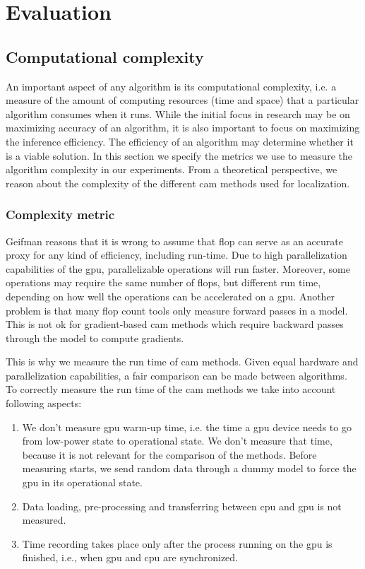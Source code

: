 \section{Evaluation}
\subsection{Computational complexity}
An important aspect of any algorithm is its computational complexity, i.e. a measure of the amount of computing resources (time and space) that a particular algorithm consumes when it runs. While the initial focus in research may be on maximizing accuracy of an algorithm, it is also important to focus on maximizing the inference efficiency. The efficiency of an algorithm may determine whether it is a viable solution. In this section we specify the metrics we use to measure the algorithm complexity in our experiments. From a theoretical perspective, we reason about the complexity of the different \acrshort{cam} methods used for localization.

\subsubsection{Complexity metric}
Geifman \cite{article:FLOPSvsRuntime} reasons that it is wrong to assume that \acrfull{flop} can serve as an accurate proxy for any kind of efficiency, including run-time. Due to high parallelization capabilities of the \acrshort{gpu}, parallelizable operations will run faster. Moreover, some operations may require the same number of \acrshort{flop}s, but different run time, depending on how well the operations can be accelerated on a \acrshort{gpu}. Another problem is that many \acrshort{flop} count tools only measure forward passes in a model. This is not ok for gradient-based \acrshort{cam} methods which require backward passes through the model to compute gradients.

This is why we measure the run time of \acrshort{cam} methods. Given equal hardware and parallelization capabilities, a fair comparison can be made between algorithms. To correctly measure the run time of the \acrshort{cam} methods we take into account following aspects:
\begin{enumerate}
    \item We don't measure \acrshort{gpu} warm-up time, i.e. the time a \acrshort{gpu} device needs to go from low-power state to operational state. We don't measure that time, because it is not relevant for the comparison of the methods. Before measuring starts, we send random data through a dummy model to force the \acrshort{gpu} in its operational state.
    \item Data loading, pre-processing and transferring between \acrshort{cpu} and \acrshort{gpu} is not measured.
    \item  Time recording takes place only after the process running on the \acrshort{gpu} is finished, i.e., when \acrshort{gpu} and \acrshort{cpu} are synchronized.
\end{enumerate}
